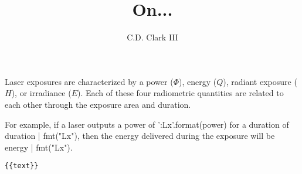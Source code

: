 \documentclass[]{article}
\author{C.D. Clark III}
\title{On...}
\begin{document}
\maketitle


Laser exposures are characterized by a power ($\Phi$), energy ($Q$), radiant exposure ($H$),
or irradiance ($E$). Each of these four radiometric quantities are related to each other
through the exposure area and duration.


For example, if a laser outputs a power of {{'{:Lx}'.format(power)}} for a
duration of {{duration | fmt("Lx")}}, then the energy delivered during the
exposure will be {{energy | fmt("Lx")}}.

\begin{verbatim}
{{text}}
\end{verbatim}
\end{document}
